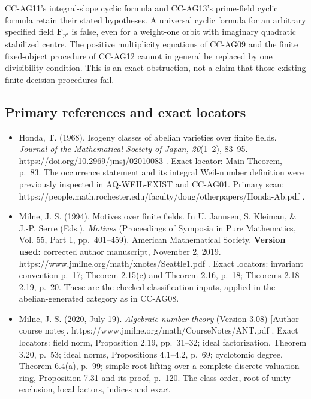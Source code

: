 CC-AG11's integral-slope cyclic formula and CC-AG13's prime-field cyclic
formula retain their stated hypotheses. A universal cyclic formula for
an arbitrary specified field \(\mathbf F_{p^a}\) is false, even for a
weight-one orbit with imaginary quadratic stabilized centre. The
positive multiplicity equations of CC-AG09 and the finite fixed-object
procedure of CC-AG12 cannot in general be replaced by one divisibility
condition. This is an exact obstruction, not a claim that those existing
finite decision procedures fail.

\subsection{Primary references and exact
locators}\label{primary-references-and-exact-locators}

\begin{itemize}
\item
  Honda, T. (1968). Isogeny classes of abelian varieties over finite
  fields. \emph{Journal of the Mathematical Society of Japan, 20}(1--2),
  83--95. https://doi.org/10.2969/jmsj/02010083 . Exact locator: Main
  Theorem, p.~83. The occurrence statement and its integral Weil-number
  definition were previously inspected in AQ-WEIL-EXIST and CC-AG01.
  Primary scan:
  https://people.math.rochester.edu/faculty/doug/otherpapers/Honda-Ab.pdf
  .
\item
  Milne, J. S. (1994). Motives over finite fields. In U. Jannsen, S.
  Kleiman, \& J.-P. Serre (Eds.), \emph{Motives} (Proceedings of
  Symposia in Pure Mathematics, Vol. 55, Part 1, pp.~401--459). American
  Mathematical Society. \textbf{Version used:} corrected author
  manuscript, November 2, 2019.
  https://www.jmilne.org/math/xnotes/Seattle1.pdf . Exact locators:
  invariant convention p.~17; Theorem 2.15(c) and Theorem 2.16, p.~18;
  Theorems 2.18--2.19, p.~20. These are the checked classification
  inputs, applied in the abelian-generated category as in CC-AG08.
\item
  Milne, J. S. (2020, July 19). \emph{Algebraic number theory} (Version
  3.08) {[}Author course notes{]}.
  https://www.jmilne.org/math/CourseNotes/ANT.pdf . Exact locators:
  field norm, Proposition 2.19, pp.~31--32; ideal factorization, Theorem
  3.20, p.~53; ideal norms, Propositions 4.1--4.2, p.~69; cyclotomic
  degree, Theorem 6.4(a), p.~99; simple-root lifting over a complete
  discrete valuation ring, Proposition 7.31 and its proof, p.~120. The
  class order, root-of-unity exclusion, local factors, indices and exact

\end{itemize}
